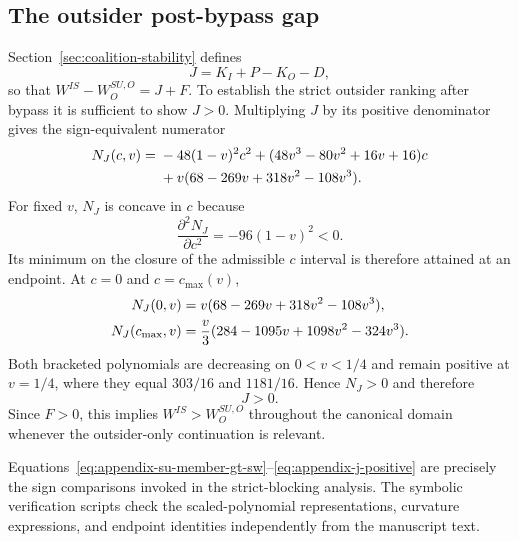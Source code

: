 \subsection{The outsider post-bypass gap}
\label{app:j-positive}

Section~\ref{sec:coalition-stability} defines
\[
J=K_I+P-K_O-D,
\]
so that $W^{IS}-W_O^{SU,O}=J+F$. To establish the strict outsider ranking after bypass it is sufficient to show $J>0$. Multiplying $J$ by its positive denominator gives the sign-equivalent numerator
\begin{align}
N_J(c,v)
={}&-48(1-v)^2c^2
+(48v^3-80v^2+16v+16)c\notag\\
&+v(68-269v+318v^2-108v^3).
\label{eq:appendix-j-numerator}
\end{align}
For fixed $v$, $N_J$ is concave in $c$ because
\[
\frac{\partial^2N_J}{\partial c^2}=-96(1-v)^2<0.
\]
Its minimum on the closure of the admissible $c$ interval is therefore attained at an endpoint. At $c=0$ and $c=c_{\max}(v)$,
\begin{align}
N_J(0,v)
&=v(68-269v+318v^2-108v^3),\notag\\
N_J(c_{\max},v)
&=\frac v3(284-1095v+1098v^2-324v^3).
\label{eq:appendix-j-endpoints}
\end{align}
Both bracketed polynomials are decreasing on $0<v<1/4$ and remain positive at $v=1/4$, where they equal $303/16$ and $1181/16$. Hence $N_J>0$ and therefore
\begin{equation}
\boxed{J>0.}
\label{eq:appendix-j-positive}
\end{equation}
Since $F>0$, this implies $W^{IS}>W_O^{SU,O}$ throughout the canonical domain whenever the outsider-only continuation is relevant.

Equations~\eqref{eq:appendix-su-member-gt-sw}--\eqref{eq:appendix-j-positive} are precisely the sign comparisons invoked in the strict-blocking analysis. The symbolic verification scripts check the scaled-polynomial representations, curvature expressions, and endpoint identities independently from the manuscript text.
